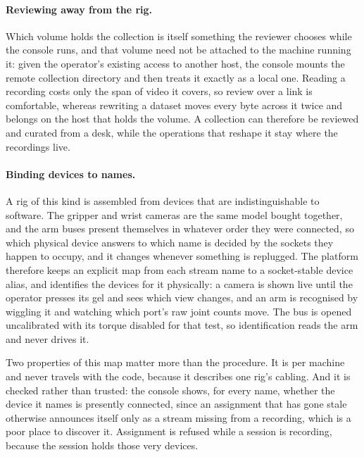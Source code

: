 \paragraph{Reviewing away from the rig.} Which volume holds the collection is
itself something the reviewer chooses while the console runs, and that volume
need not be attached to the machine running it: given the operator's existing
access to another host, the console mounts the remote collection directory and
then treats it exactly as a local one. Reading a recording costs only the span
of video it covers, so review over a link is comfortable, whereas rewriting a
dataset moves every byte across it twice and belongs on the host that holds the
volume. A collection can therefore be reviewed and curated from a desk, while
the operations that reshape it stay where the recordings live.

\paragraph{Binding devices to names.} A rig of this kind is assembled from
devices that are indistinguishable to software. The gripper and wrist cameras
are the same model bought together, and the arm buses present themselves in
whatever order they were connected, so which physical device answers to which
name is decided by the sockets they happen to occupy, and it changes whenever
something is replugged. The platform therefore keeps an explicit map from each
stream name to a socket-stable device alias, and identifies the devices for it
physically: a camera is shown live until the operator presses its gel and sees
which view changes, and an arm is recognised by wiggling it and watching which
port's raw joint counts move. The bus is opened uncalibrated with its torque
disabled for that test, so identification reads the arm and never drives it.

Two properties of this map matter more than the procedure. It is per machine
and never travels with the code, because it describes one rig's cabling.
And it is checked rather than trusted: the console shows, for every name, whether
the device it names is presently connected, since an assignment that has gone
stale otherwise announces itself only as a stream missing from a recording,
which is a poor place to discover it. Assignment is refused while a session is
recording, because the session holds those very devices.

